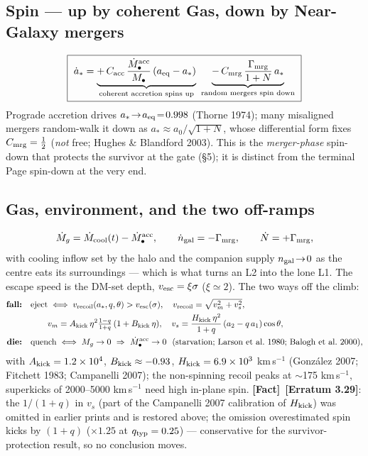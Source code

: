 \documentclass[11pt]{article}
\newcommand{\Fact}{\textbf{\textcolor{green!45!black}{[Fact]}}}
\newcommand{\Mbh}{M_{\bullet}}
\begin{document}
\subsection{Spin --- up by coherent Gas, down by Near-Galaxy mergers}
\begin{equation}
\boxed{\ \dot a_\ast=\underbrace{+\,C_{\rm acc}\,\frac{\dot\Mbh^{\rm acc}}{\Mbh}\,(a_{\rm eq}-a_\ast)}_{\text{coherent accretion spins up}}\ \underbrace{-\,C_{\rm mrg}\,\frac{\Gamma_{\rm mrg}}{1+N}\,a_\ast}_{\text{random mergers spin down}}\ }
\label{eq:spin}
\end{equation}
Prograde accretion drives $a_\ast\!\to\!a_{\rm eq}\!=\!0.998$ (Thorne 1974); many misaligned mergers random-walk it down as $a_\ast\!\approx\!a_0/\sqrt{1+N}$, whose differential form fixes $C_{\rm mrg}=\tfrac12$ (\emph{not} free; Hughes \& Blandford 2003). This is the \emph{merger-phase} spin-down that protects the survivor at the gate (\S5); it is distinct from the terminal Page spin-down at the very end.

\subsection{Gas, environment, and the two off-ramps}
\begin{equation}
\dot M_g=\dot M_{\rm cool}(t)-\dot\Mbh^{\rm acc},\qquad
\dot n_{\rm gal}=-\Gamma_{\rm mrg},\qquad \dot N=+\Gamma_{\rm mrg},
\label{eq:gasenv}
\end{equation}
with cooling inflow set by the halo and the companion supply $n_{\rm gal}\!\to\!0$ as the centre eats its surroundings --- which is what turns an L2 into the lone L1. The escape speed is the DM-set depth, $v_{\rm esc}=\xi\sigma$ ($\xi\!\simeq\!2$). The two ways off the climb:
\begin{align}
\text{\bf fall:}\quad & \text{eject}\iff v_{\rm recoil}(a_\ast,q,\theta)>v_{\rm esc}(\sigma),\quad v_{\rm recoil}=\sqrt{v_m^2+v_s^2},\\
&\qquad v_m=A_{\rm kick}\,\eta^2\tfrac{1-q}{1+q}\,(1+B_{\rm kick}\,\eta),\quad v_s=\frac{H_{\rm kick}\,\eta^2}{1+q}\,(a_2-q\,a_1)\cos\theta,\notag\\
\text{\bf die:}\quad & \text{quench}\iff M_g\to0\ \Rightarrow\ \dot\Mbh^{\rm acc}\to0\ \ (\text{starvation; Larson et al.\ 1980; Balogh et al.\ 2000}),
\end{align}
with $A_{\rm kick}=1.2\times10^4$, $B_{\rm kick}\approx-0.93$, $H_{\rm kick}=6.9\times10^3$ km\,s$^{-1}$ (Gonz\'alez 2007; Fitchett 1983; Campanelli 2007); the non-spinning recoil peaks at $\sim$175 km\,s$^{-1}$, superkicks of 2000--5000 km\,s$^{-1}$ need high in-plane spin. \Fact\ \textbf{[Erratum 3.29]}: the $1/(1+q)$ in $v_s$ (part of the Campanelli 2007 calibration of $H_{\rm kick}$) was omitted in earlier prints and is restored above; the omission overestimated spin kicks by $(1+q)$ ($\times1.25$ at $q_{\rm typ}=0.25$) --- conservative for the survivor-protection result, so no conclusion moves.
\end{document}
